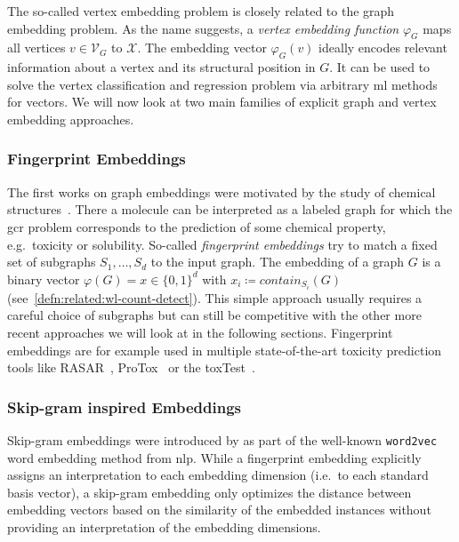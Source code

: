 The so-called vertex embedding problem is closely related to the graph embedding problem.
As the name suggests, a \textit{vertex embedding function} $\varphi_G$ maps all vertices $v \in \mathcal{V}_G$ to $\mathcal{X}$.
The embedding vector $\varphi_G(v)$ ideally encodes relevant information about a vertex and its structural position in $G$.
It can be used to solve the vertex classification and regression problem via arbitrary \ac{ml} methods for vectors.
We will now look at two main families of explicit graph and vertex embedding approaches.

\subsubsection{Fingerprint Embeddings}

The first works on graph embeddings were motivated by the study of chemical structures~\cite{Adamson1973}\cite{Willett1986}.
There a molecule can be interpreted as a labeled graph for which the \ac{gcr} problem corresponds to the prediction of some chemical property, e.g.\ toxicity or solubility.
So-called \textit{fingerprint embeddings} try to match a fixed set of subgraphs $S_1, \dots, S_d$ to the input graph.
The embedding of a graph $G$ is a binary vector $\varphi(G) = x \in {\{0, 1\}}^d$ with $x_i \coloneqq \mathit{contain}_{S_i}(G)$ (see~\cref{defn:related:wl-count-detect}).
This simple approach usually requires a careful choice of subgraphs but can still be competitive with the other more recent approaches we will look at in the following sections.
Fingerprint embeddings are for example used in multiple state-of-the-art toxicity prediction tools like RASAR~\cite{Luechtefeld2018}\cite{ToxTrack}, ProTox~\cite{Drwal2014}\cite{ProTox}\cite{Banerjee2018} or the \ac{toxTest}~\cite{TEST}.

\subsubsection{Skip-gram inspired Embeddings}

Skip-gram embeddings were introduced by \citeauthor{Mikolov2013} as part of the well-known \texttt{word2vec}~\cite{Mikolov2013} word embedding method from \ac{nlp}.
While a fingerprint embedding explicitly assigns an interpretation to each embedding dimension (i.e.\ to each standard basis vector), a skip-gram embedding only optimizes the distance between embedding vectors based on the similarity of the embedded instances without providing an interpretation of the embedding dimensions.

